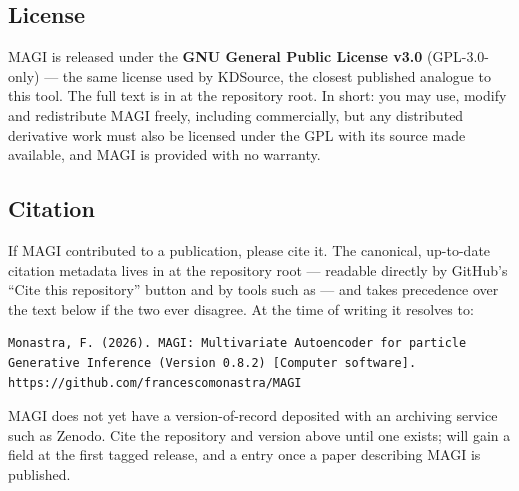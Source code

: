 \documentclass[11pt,a4paper]{article}
\begin{document}
\subsection{License}

MAGI is released under the \textbf{GNU General Public License v3.0}
(GPL-3.0-only) --- the same license used by KDSource, the closest published
analogue to this tool. The full text is in  at the repository
root. In short: you may use, modify and redistribute MAGI freely, including
commercially, but any distributed derivative work must also be licensed under
the GPL with its source made available, and MAGI is provided with no warranty.

\subsection{Citation}

If MAGI contributed to a publication, please cite it. The canonical,
up-to-date citation metadata lives in  at the repository
root --- readable directly by GitHub's ``Cite this repository'' button and by
tools such as  --- and takes precedence over the text below if
the two ever disagree. At the time of writing it resolves to:

\begin{lstlisting}[language=shell]
Monastra, F. (2026). MAGI: Multivariate Autoencoder for particle
Generative Inference (Version 0.8.2) [Computer software].
https://github.com/francescomonastra/MAGI
\end{lstlisting}

\begin{maginote}
MAGI does not yet have a version-of-record deposited with an archiving service
such as Zenodo. Cite the repository and version above until one exists;
 will gain a  field at the first
tagged release, and a  entry once a paper describing
MAGI is published.
\end{maginote}

\newpage


\end{document}
